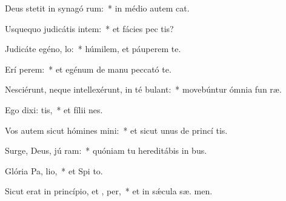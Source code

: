 \item Deus stetit in synagó rum:~* in médio autem  cat.
\item Usquequo judicátis intem:~* et fácies pec tis?
\item Judicáte egéno,  lo:~* húmilem, et páuperem te.
\item Erí perem:~* et egénum de manu peccató te.
\item Nesciérunt, neque intellexérunt, in té bulant:~* movebúntur ómnia fun ræ.
\item Ego dixi:  tis,~* et fílii  nes.
\item Vos autem sicut hómines mini:~* et sicut unus de princí tis.
\item Surge, Deus, jú ram:~* quóniam tu hereditábis in  bus.
\item Glória Pa,  lio,~* et Spi to.
\item Sicut erat in princípio, et ,  per,~* et in sǽcula sæ. men.

